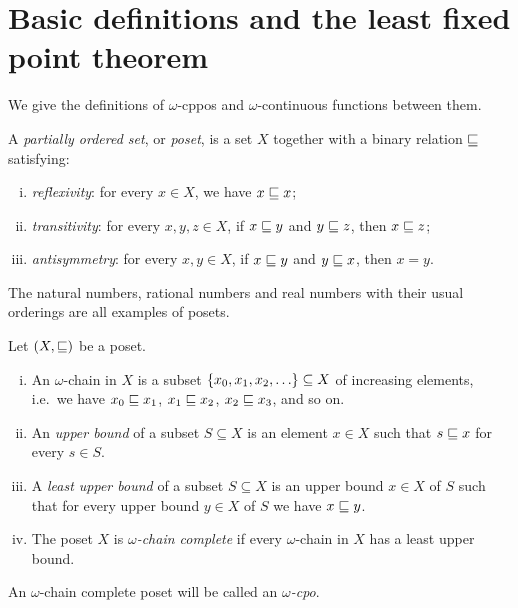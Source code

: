 \section{Basic definitions and the least fixed point theorem}

We give the definitions of \(\omega\)-cppos and \(\omega\)-continuous functions
between them.

\begin{definition}[Poset]
  A \emph{partially ordered set}, or \emph{poset}, is a set \(X\) together with
  a binary relation \({\sqsubseteq}\) satisfying:
  \begin{enumerate}[(i)]
  \item \emph{reflexivity}: for every \(x \in X\), we have \(x \sqsubseteq x\);
  \item \emph{transitivity}: for every \(x,y,z \in X\), if \(x \sqsubseteq y\) and
    \(y \sqsubseteq z\), then \(x \sqsubseteq z\);
  \item \emph{antisymmetry}: for every \(x,y \in X\), if \(x \sqsubseteq y\) and
    \(y \sqsubseteq x\), then \(x = y\). \qedhere
  \end{enumerate}
\end{definition}

\begin{example}
  The natural numbers, rational numbers and real numbers with their usual
  orderings are all examples of posets.
\end{example}

\begin{definition}
  Let \((X,{\sqsubseteq})\) be a poset.
  \begin{enumerate}[(i)]
  \item An \(\omega\)-chain in \(X\) is a subset
    \(\set{x_0,x_1,x_2,\dots} \subseteq X\) of increasing elements, i.e.\ we
    have \(x_0 \sqsubseteq x_1\), \(x_1 \sqsubseteq x_2\), \(x_2 \sqsubseteq x_3\), and so
    on.%
  \item An \emph{upper bound} of a subset \(S \subseteq X\) is an element
    \(x \in X\) such that \(s \sqsubseteq x\) for every \(s \in S\).
  \item A \emph{least upper bound} of a subset \(S \subseteq X\) is an upper
    bound \(x \in X\) of \(S\) such that for every upper bound \(y \in X\) of
    \(S\) we have \(x \sqsubseteq y\).
  \item The poset \(X\) is \emph{\(\omega\)-chain complete} if every
    \(\omega\)-chain in \(X\) has a least upper bound.%
  \end{enumerate}
  An \(\omega\)-chain complete poset will be called an \emph{\(\omega\)-cpo}.
\end{definition}

